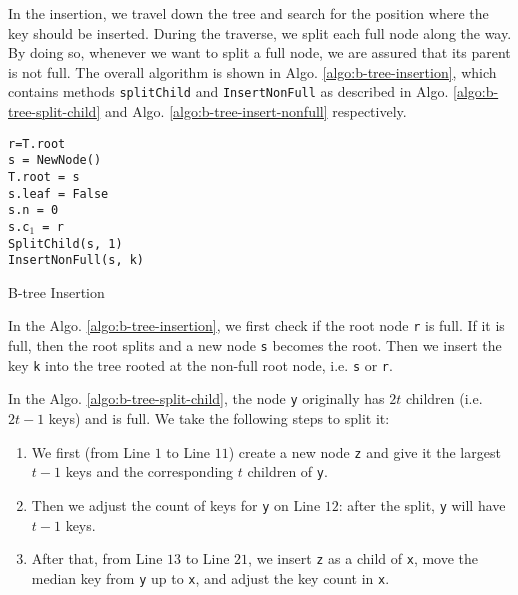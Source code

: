 In the insertion, we travel down the tree and search for the position where the key should be inserted. During the traverse, we split each full node along the way. By doing so, whenever we want to split a full node, we are assured that its parent is not full. The overall algorithm is shown in Algo. \ref{algo:b-tree-insertion}, which contains methods \texttt{splitChild} and \texttt{InsertNonFull} as described in Algo. \ref{algo:b-tree-split-child} and Algo. \ref{algo:b-tree-insert-nonfull} respectively.

\begin{algorithm}[H]
\SetAlgoLined
{}
	\texttt{r=T.root} \\
  {
  \texttt{s = NewNode()} \\
  \texttt{T.root = s} \\
  \texttt{s.leaf = False} \\
  \texttt{s.n = 0} \\
  \texttt{s.c$_1$ = r} \\
  \texttt{SplitChild(s, 1)} \\
  \texttt{InsertNonFull(s, k)} \\
 }
 \caption{B-tree Insertion}
 \label{algo:b-tree-insertion}
\end{algorithm}

In the Algo. \ref{algo:b-tree-insertion}, we first check if the root node \texttt{r} is full. If it is full, then the root splits and a new node \texttt{s} becomes the root. Then we insert the key \texttt{k} into the tree rooted at the non-full root node, i.e. \texttt{s} or \texttt{r}.

In the Algo. \ref{algo:b-tree-split-child}, the node \texttt{y} originally has $2t$ children (i.e. $2t-1$ keys) and is full. We take the following steps to split it:

\begin{enumerate}
	\item We first (from Line $1$ to Line $11$) create a new node \texttt{z} and give it the largest $t-1$ keys and the corresponding $t$ children of \texttt{y}.
	\item Then we adjust the count of keys for \texttt{y} on Line $12$: after the split, \texttt{y} will have $t-1$ keys.
	\item After that, from Line $13$ to Line $21$, we insert \texttt{z} as a child of \texttt{x}, move the median key from \texttt{y} up to \texttt{x}, and adjust the key count in \texttt{x}.
\end{enumerate}

